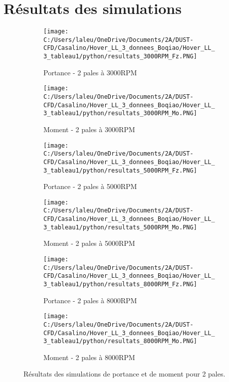 \documentclass{article}
\begin{document}
	\section{Résultats des simulations}
\begin{figure}[h]
	\centering
	
	\begin{subfigure}{0.45\textwidth}
		\texttt{[image: C:/Users/laleu/OneDrive/Documents/2A/DUST-CFD/Casalino/Hover\_LL\_3\_donnees\_Boqiao/Hover\_LL\_3\_tableau1/python/resultats\_3000RPM\_Fz.PNG]}
		\caption{Portance - 2 pales à 3000RPM}
	\end{subfigure}
	\hfill
	\begin{subfigure}{0.45\textwidth}
		\texttt{[image: C:/Users/laleu/OneDrive/Documents/2A/DUST-CFD/Casalino/Hover\_LL\_3\_donnees\_Boqiao/Hover\_LL\_3\_tableau1/python/resultats\_3000RPM\_Mo.PNG]}
		\caption{Moment - 2 pales à 3000RPM}
	\end{subfigure}
	
	\begin{subfigure}{0.45\textwidth}
		\texttt{[image: C:/Users/laleu/OneDrive/Documents/2A/DUST-CFD/Casalino/Hover\_LL\_3\_donnees\_Boqiao/Hover\_LL\_3\_tableau1/python/resultats\_5000RPM\_Fz.PNG]}
		\caption{Portance - 2 pales à 5000RPM}
	\end{subfigure}
	\hfill
	\begin{subfigure}{0.45\textwidth}
		\texttt{[image: C:/Users/laleu/OneDrive/Documents/2A/DUST-CFD/Casalino/Hover\_LL\_3\_donnees\_Boqiao/Hover\_LL\_3\_tableau1/python/resultats\_5000RPM\_Mo.PNG]}
		\caption{Moment - 2 pales à 5000RPM}
	\end{subfigure}
	
	\begin{subfigure}{0.45\textwidth}
		\texttt{[image: C:/Users/laleu/OneDrive/Documents/2A/DUST-CFD/Casalino/Hover\_LL\_3\_donnees\_Boqiao/Hover\_LL\_3\_tableau1/python/resultats\_8000RPM\_Fz.PNG]}
		\caption{Portance - 2 pales à 8000RPM}
	\end{subfigure}
	\hfill
	\begin{subfigure}{0.45\textwidth}
		\texttt{[image: C:/Users/laleu/OneDrive/Documents/2A/DUST-CFD/Casalino/Hover\_LL\_3\_donnees\_Boqiao/Hover\_LL\_3\_tableau1/python/resultats\_8000RPM\_Mo.PNG]}
		\caption{Moment - 2 pales à 8000RPM}
	\end{subfigure}
	
	\caption{Résultats des simulations de portance et de moment pour 2 pales.}
	\label{fig:grid_rpm_2pales}
\end{figure}
\end{document}

